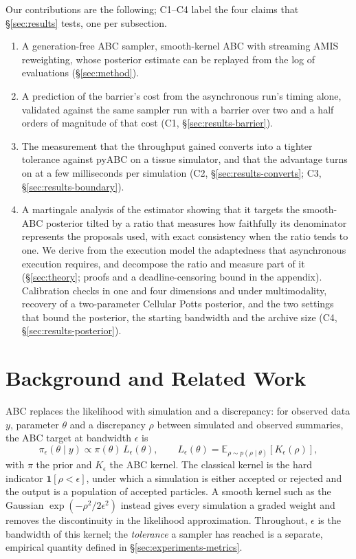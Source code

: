 \documentclass[10pt]{article}
\theoremstyle{plain}
\theoremstyle{definition}
\begin{document}
Our contributions are the following; C1--C4 label the four claims that \S\ref{sec:results} tests, one per subsection.
\begin{enumerate}
\item A generation-free ABC sampler, smooth-kernel ABC with streaming AMIS reweighting, whose posterior estimate can be replayed from the log of evaluations (\S\ref{sec:method}).
\item A prediction of the barrier's cost from the asynchronous run's timing alone, validated against the same sampler run with a barrier over two and a half orders of magnitude of that cost (C1, \S\ref{sec:results-barrier}).
\item The measurement that the throughput gained converts into a tighter tolerance against pyABC on a tissue simulator, and that the advantage turns on at a few milliseconds per simulation (C2, \S\ref{sec:results-converts}; C3, \S\ref{sec:results-boundary}).
\item A martingale analysis of the estimator showing that it targets the smooth-ABC posterior tilted by a ratio that measures how faithfully its denominator represents the proposals used, with exact consistency when the ratio tends to one. We derive from the execution model the adaptedness that asynchronous execution requires, and decompose the ratio and measure part of it (\S\ref{sec:theory}; proofs and a deadline-censoring bound in the appendix). Calibration checks in one and four dimensions and under multimodality, recovery of a two-parameter Cellular Potts posterior, and the two settings that bound the posterior, the starting bandwidth and the archive size (C4, \S\ref{sec:results-posterior}).
\end{enumerate}

\section{Background and Related Work}\label{sec:background}\label{sec:background-abc}\label{sec:background-sequential}\label{sec:background-amis}\label{sec:background-distributed}
ABC replaces the likelihood with simulation and a discrepancy: for observed data $y$, parameter $\theta$ and a discrepancy $\rho$ between simulated and observed summaries, the ABC target at bandwidth $\epsilon$ is
\begin{equation}
\pi_{\epsilon}(\theta \mid y) \propto \pi(\theta)\, L_{\epsilon}(\theta),
\qquad
L_{\epsilon}(\theta) = \mathbb{E}_{\rho \sim p(\rho \mid \theta)}\!\left[K_{\epsilon}(\rho)\right],
\label{eq:abc-target}
\end{equation}
with $\pi$ the prior and $K_\epsilon$ the ABC kernel. The classical kernel is the hard indicator $\mathbf{1}[\rho<\epsilon]$, under which a simulation is either accepted or rejected and the output is a population of accepted particles. A smooth kernel such as the Gaussian $\exp(-\rho^2/2\epsilon^2)$ \citep{wilkinson2013,fearnhead2012} instead gives every simulation a graded weight and removes the discontinuity in the likelihood approximation. Throughout, $\epsilon$ is the bandwidth of this kernel; the \emph{tolerance} a sampler has reached is a separate, empirical quantity defined in \S\ref{sec:experiments-metrics}.
\end{document}
